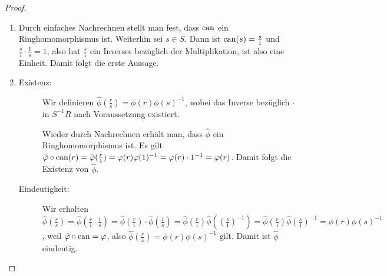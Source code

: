 \documentclass[12pt,a4paper]{scrartcl}
\begin{document}
\begin{proof}
	\leavevmode
	\begin{enumerate}
		\item Durch einfaches Nachrechnen stellt man fest, dass $\operatorname{can}$ ein Ringhomomorphismus ist. Weiterhin sei $s\in S$. Dann ist $\operatorname{can}(s) = \frac s1$ und $\frac s1\cdot \frac1s = 1$, also hat $\frac s1$ ein Inverses bezüglich der Multiplikation, ist also eine Einheit. Damit folgt die erste Aussage.
		\item \begin{description}
			\item[Existenz:] Wir definieren $\hat{\phi}(\frac rs) = \phi(r)\phi(s)^{-1}$, wobei das Inverse bezüglich $\cdot$ in $S^{-1}R$ nach Voraussetzung existiert.
			
			Wieder durch Nachrechnen erhält man, dass $\hat{\phi}$ ein Ringhomomorphismus ist. Es gilt $\hat{\varphi}\circ \operatorname{can}(r) = \hat{\varphi}(\frac r1) = \varphi(r)\varphi(1)^{-1} = \varphi(r)\cdot 1^{-1} = \varphi(r) $. Damit folgt die Existenz von $\hat{\phi}$.
			\item[Eindeutigkeit:] Wir erhalten $\hat{\phi}(\frac rs) = \hat{\phi} (\frac r1\cdot \frac1s) = \hat{\phi}(\frac r1)\cdot \hat{\phi}(\frac1s) = \hat{\phi}(\frac r1)\hat{\phi}((\frac s1)^{-1}) = \hat{\phi}(\frac r1)\hat{\phi}(\frac s1)^{-1} = \phi(r)\phi(s)^{-1}$, weil $\hat{\varphi}\circ\operatorname{can} = \varphi$, also $\hat{\phi}(\frac rs) = \phi(r)\phi(s)^{-1}$ gilt. Damit ist $\hat{\phi}$ eindeutig.
    \qedhere
		\end{description}
	\end{enumerate}
\end{proof}
\end{document}
